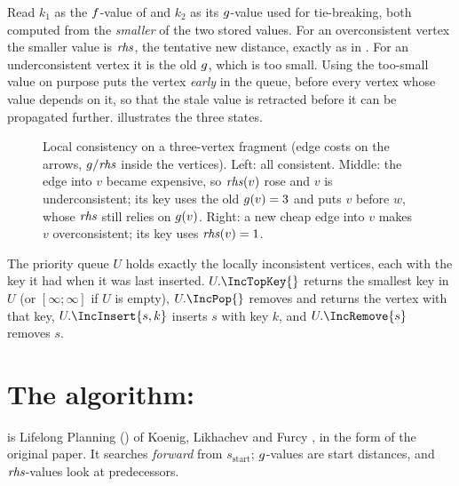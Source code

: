 Read $k_1$ as the $f$-value of \astar and $k_2$ as its $g$-value used for
tie-breaking, both computed from the \emph{smaller} of the two stored values. For an
overconsistent vertex the smaller value is $\mathit{rhs}$, the tentative new distance, exactly
as in \astar. For an underconsistent vertex it is the old $g$, which is too small.
Using the too-small value on purpose puts the vertex \emph{early} in the queue, before
every vertex whose value depends on it, so that the stale value is retracted before it
can be propagated further.  illustrates the three states.

\begin{figure}[tb]
  \centering
  \caption{Local consistency on a three-vertex fragment (edge costs on the arrows,
  $g/\mathit{rhs}$ inside the vertices). Left: all consistent. Middle: the edge into $v$
  became expensive, so $\mathit{rhs}(v)$ rose and $v$ is underconsistent; its key uses the old
  $g(v)=3$ and puts $v$ before $w$, whose $\mathit{rhs}$ still relies on $g(v)$. Right:
  a new cheap edge into $v$ makes $v$ overconsistent; its key uses $\mathit{rhs}(v)=1$.}
  \label{fig:ch05-consistency}
\end{figure}

The priority queue $U$ holds exactly the locally inconsistent vertices, each with the
key it had when it was last inserted. $U.\IncTopKey{}$ returns the smallest key in $U$
(or $[\infty;\infty]$ if $U$ is empty), $U.\IncPop{}$ removes and returns the vertex
with that key, $U.\IncInsert{s, k}$ inserts $s$ with key $k$, and $U.\IncRemove{s}$
removes $s$.

\section{The algorithm: \lpastar}
\label{sec:ch05-lpastar}

 is Lifelong Planning \astar (\lpastar) of Koenig, Likhachev and
Furcy \cite{koenig2004lpa}, in the form of the original paper. It searches
\emph{forward} from $s_{\mathrm{start}}$; $g$-values are start distances, and
$\mathit{rhs}$-values look at predecessors.

